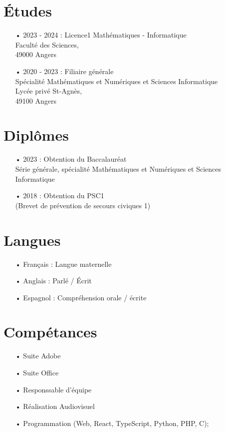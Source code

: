 \documentclass[french]{article}
\begin{document}
\section*{Études}
\begin{itemize}
	\item[• 2023 - 2024 :] Licence1 Mathématiques - Informatique \\ Faculté des Sciences, \\ 49000 Angers
	
	\item[• 2020 - 2023 :] Filiaire générale \\ Spécialité Mathématiques et Numériques et Sciences Informatique \\ Lycée privé St-Agnès, \\ 49100 Angers
\end{itemize}

\section*{Diplômes}
\begin{itemize}
	\item[• 2023 :] Obtention du Baccalauréat \\ Série générale, spécialité Mathématiques et Numériques et Sciences Informatique
	
	\item[• 2018 :] Obtention du PSC1 \\ (Brevet de prévention de secours civiques 1)
\end{itemize}

\section*{Langues}
\begin{itemize}
	\item[• Français :] Langue maternelle
	
	\item[• Anglais :] Parlé / Écrit

	\item[• Espagnol :] Compréhension orale / écrite
\end{itemize}

\section*{Compétances}
\begin{itemize}
	\item[•] Suite Adobe
	\item[•] Suite Office
	\item[•] Responssable d'équipe
	\item[•] Réalisation Audiovisuel
	\item[•] Programmation (Web, React, TypeScript, Python, PHP, C);
	
\end{itemize}
\end{document}
